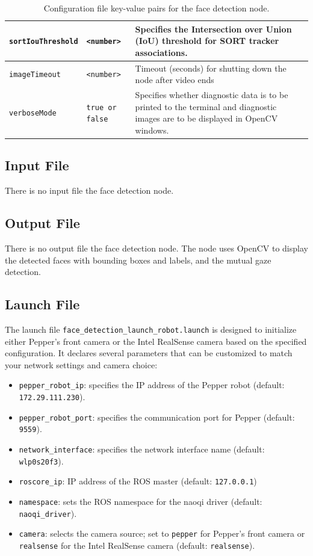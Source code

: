 \documentclass{CSSRforAfrica}
\begin{document}
{\begin{table}[h!]
\begin{tabularx}{\linewidth}{| l | l | X|}
		\hline
		{\footnotesize \texttt{sortIouThreshold}}       & {\footnotesize \texttt{<number>}}              & {\small Specifies the Intersection over Union (IoU) threshold for SORT tracker associations.} \\
		\hline
		{\footnotesize \texttt{imageTimeout}}           & {\footnotesize \texttt{<number>}}              & {\small Timeout (seconds) for shutting down the node after video ends} \\
		\hline
		{\footnotesize \texttt{verboseMode}}           & {\footnotesize \texttt{true or false}}         & {\small Specifies whether diagnostic data is to be printed to the terminal and diagnostic images are to be displayed in OpenCV windows.} \\
		\hline
	\end{tabularx}
	\caption{Configuration file key-value pairs for the face detection node.}
\end{table}


\subsection*{Input File}
There is no input file the face detection node.

\subsection*{Output File}
There is no output file the face detection node. The node uses OpenCV to display the detected faces with bounding boxes and labels, and the mutual gaze detection.

\subsection*{Launch File}
The launch file \texttt{face\_detection\_launch\_robot.launch} is designed to initialize either Pepper's front camera or the Intel RealSense camera based on the specified configuration. It declares several parameters that can be customized to match your network settings and camera choice:
\begin{itemize}
	\setlength\itemsep{0em}
	\item \texttt{pepper\_robot\_ip}: specifies the IP address of the Pepper robot (default: \texttt{172.29.111.230}).
	\item \texttt{pepper\_robot\_port}: specifies the communication port for Pepper (default: \texttt{9559}).
	\item \texttt{network\_interface}: specifies the network interface name (default: \texttt{wlp0s20f3}).
	\item \texttt{roscore\_ip}: IP address of the ROS master (default: \texttt{127.0.0.1})
	\item \texttt{namespace}: sets the ROS namespace for the naoqi driver (default: \texttt{naoqi\_driver}).
	\item \texttt{camera}: selects the camera source; set to \texttt{pepper} for Pepper's front camera or \texttt{realsense} for the Intel RealSense camera (default: \texttt{realsense}).
\end{itemize}

}
\end{document}

